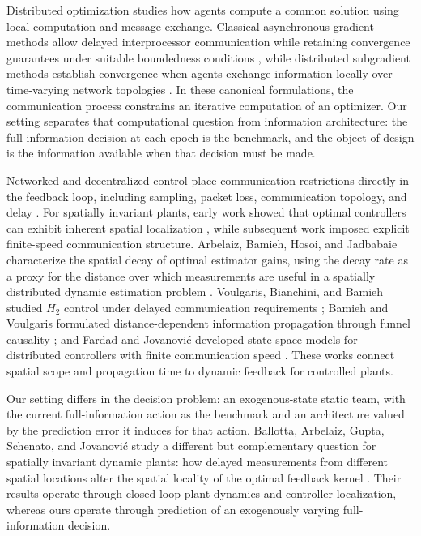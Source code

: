 \documentclass[11pt]{article}
\begin{document}
Distributed optimization studies how agents compute a common solution using local computation and message exchange. Classical asynchronous gradient methods allow delayed interprocessor communication while retaining convergence guarantees under suitable boundedness conditions \cite{tsitsiklis1986distributed}, while distributed subgradient methods establish convergence when agents exchange information locally over time-varying network topologies \cite{nedic2009distributed}. In these canonical formulations, the communication process constrains an iterative computation of an optimizer. Our setting separates that computational question from information architecture: the full-information decision at each epoch is the benchmark, and the object of design is the information available when that decision must be made.

Networked and decentralized control place communication restrictions directly
in the feedback loop, including sampling, packet loss, communication topology,
and delay \cite{hespanha2007survey}. For spatially invariant plants, early work
showed that optimal controllers can exhibit inherent spatial localization
\cite{bamieh2002spatial}, while subsequent work imposed explicit finite-speed
communication structure. Arbelaiz, Bamieh, Hosoi, and Jadbabaie characterize
the spatial decay of optimal estimator gains, using the decay rate as a proxy
for the distance over which measurements are useful in a spatially distributed
dynamic estimation problem \cite{arbelaiz2025estimation}. Voulgaris, Bianchini, and Bamieh studied $H_2$ control
under delayed communication requirements \cite{voulgaris2003optimal}; Bamieh
and Voulgaris formulated distance-dependent information propagation through
funnel causality \cite{bamieh2005convex}; and Fardad and Jovanovi\'c developed
state-space models for distributed controllers with finite communication speed
\cite{fardad2011finite}. These works connect spatial scope and propagation time to dynamic feedback
for controlled plants.

Our setting differs in the decision problem: an exogenous-state static team,
with the current full-information action as the benchmark and an architecture
valued by the prediction error it induces for that action. 
Ballotta, Arbelaiz, Gupta, Schenato, and Jovanovi\'c study a different but
complementary question for spatially invariant dynamic plants: how delayed
measurements from different spatial locations alter the spatial locality of the
optimal feedback kernel \cite{ballotta2026role}. Their results operate through
closed-loop plant dynamics and controller localization, whereas ours operate
through prediction of an exogenously varying full-information decision.
\end{document}
